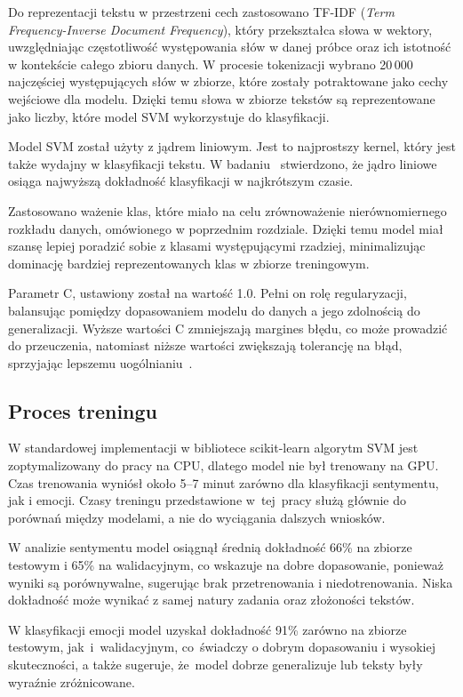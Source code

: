 Do reprezentacji tekstu w przestrzeni cech zastosowano TF-IDF (\textit{Term Frequency-Inverse Document Frequency}), który przekształca słowa w wektory, uwzględniając częstotliwość występowania słów w danej próbce oraz ich istotność w kontekście całego zbioru danych. W procesie tokenizacji wybrano 20\,000 najczęściej występujących słów w zbiorze, które zostały potraktowane jako cechy wejściowe dla modelu. Dzięki temu słowa w zbiorze tekstów są reprezentowane jako liczby, które model SVM wykorzystuje do klasyfikacji.

Model SVM został użyty z jądrem liniowym. Jest to najprostszy kernel, który jest także wydajny w klasyfikacji tekstu. W badaniu~\cite{KernelComparison} stwierdzono, że jądro liniowe osiąga najwyższą dokładność klasyfikacji w najkrótszym czasie. 

Zastosowano ważenie klas, które miało na celu zrównoważenie nierównomiernego rozkładu danych, omówionego w poprzednim rozdziale. Dzięki temu model miał szansę lepiej poradzić sobie z klasami występującymi rzadziej, minimalizując dominację bardziej reprezentowanych klas w zbiorze treningowym.

Parametr C, ustawiony został na wartość 1.0. Pełni on rolę regularyzacji, balansując pomiędzy dopasowaniem modelu do danych a jego zdolnością do generalizacji. Wyższe wartości C zmniejszają margines błędu, co może prowadzić do przeuczenia, natomiast niższe wartości zwiększają tolerancję na błąd, sprzyjając lepszemu uogólnianiu~\cite{UczMasz}.

\subsection{Proces treningu}
W standardowej implementacji w bibliotece scikit-learn algorytm SVM jest zoptymalizowany do pracy na CPU, dlatego model nie był trenowany na GPU. Czas trenowania wyniósł około 5--7 minut zarówno dla klasyfikacji sentymentu, jak i emocji. Czasy treningu przedstawione w~tej~pracy służą głównie do porównań między modelami, a nie do wyciągania dalszych wniosków.

W analizie sentymentu model osiągnął średnią dokładność 66\% na zbiorze testowym i 65\% na walidacyjnym, co wskazuje na dobre dopasowanie, ponieważ wyniki są porównywalne, sugerując brak przetrenowania i niedotrenowania. Niska dokładność może wynikać z samej natury zadania oraz złożoności tekstów.

W klasyfikacji emocji model uzyskał dokładność 91\% zarówno na zbiorze testowym, jak~i~walidacyjnym, co~świadczy o dobrym dopasowaniu i wysokiej skuteczności, a także sugeruje, że~model dobrze generalizuje lub teksty były wyraźnie zróżnicowane.


